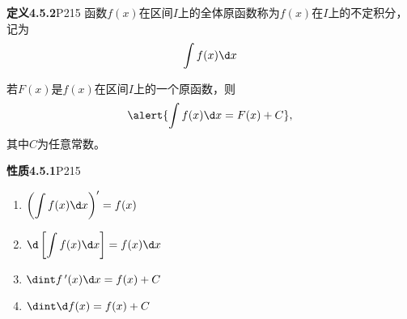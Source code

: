 
\begin{frame}
	\linespread{1.2}
	\begin{block}{{\bf 定义4.5.2}\hfill P215}
		函数$f(x)$在区间$I$上的全体原函数称为{\bb $f(x)$在$I$上的不定积分}，记为
		$$\int f(x)\d x$$
	\end{block}\pause 
	若$F(x)$是$f(x)$在区间$I$上的一个原函数，\pause 则
	$$\alert{\int f(x)\d x=F(x)+C},$$
	\pause 其中\alert{$C$为任意常数}。
\end{frame}

\begin{frame}
	\linespread{2.5}
	\begin{block}{{\bf 性质4.5.1}\hfill P215}\pause
		\begin{enumerate}
		  \item $\left(\displaystyle\int f(x)\d x\right)'=f(x)$\pause 
		  \item $\d\left[\displaystyle\int f(x)\d x\right]=f(x)\d x$\pause 
		  \item $\dint f\,'(x)\d x =f(x)+C$\pause
		  \item $\dint \d f(x)=f(x)+C$
		\end{enumerate}
	\end{block}
\end{frame}

